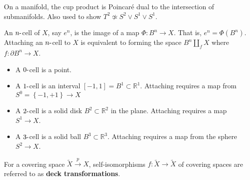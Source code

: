 \begin{example}

On a manifold, the cup product is Poincaré dual to the intersection of
submanifolds. Also used to show
\(T^2 \not\simeq S^2 \vee S^1 \vee S^1\).

\end{example}

\begin{definition}[CW Complex]

\end{definition}


\begin{definition}[CW Cell]

An \(n{\hbox{-}}\)cell of \(X\), say \(e^n\), is the image of a map
\(\Phi: B^n \to X\). That is, \(e^n = \Phi(B^n)\). Attaching an
\(n{\hbox{-}}\)cell to \(X\) is equivalent to forming the space
\(B^n \coprod_{f} X\) where \(f: {\partial}B^n \to X\).

\begin{itemize}
\tightlist
\item
  A \(0{\hbox{-}}\)cell is a point.
\item
  A \(1{\hbox{-}}\)cell is an interval
  \([-1, 1] = B^1 \subset {\mathbb{R}}^1\). Attaching requires a map
  from \(S^0 =\left\{{-1, +1}\right\} \to X\)
\item
  A \(2{\hbox{-}}\)cell is a solid disk \(B^2 \subset {\mathbb{R}}^2\)
  in the plane. Attaching requires a map \(S^1 \to X\).
\item
  A \(3{\hbox{-}}\)cell is a solid ball \(B^3 \subset {\mathbb{R}}^3\).
  Attaching requires a map from the sphere \(S^2 \to X\).
\end{itemize}

\end{definition}

\begin{definition}[Cycle]

\end{definition}


\begin{definition}

For a covering space \(\tilde X \xrightarrow{p} X\), self-isomorphisms
\(f:\tilde X \to \tilde X\) of covering spaces are referred to as
\textbf{deck transformations}.

\end{definition}

